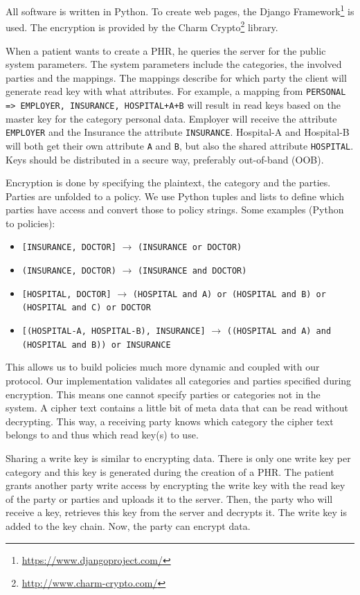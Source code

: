 \documentclass[a4paper]{article}
\begin{document}
		All software is written in Python. To create web pages, the Django Framework\footnote{\url{https://www.djangoproject.com/}} is used. The encryption is provided by the Charm Crypto\footnote{\url{http://www.charm-crypto.com/}} library.
	
		When a patient wants to create a PHR, he queries the server for the public system parameters. The system parameters include the categories, the involved parties and the mappings. The mappings describe for which party the client will generate read key with what attributes. For example, a mapping from \texttt{PERSONAL => EMPLOYER, INSURANCE, HOSPITAL+A+B} will result in read keys based on the master key for the category personal data. Employer will receive the attribute \texttt{EMPLOYER} and the Insurance the attribute \texttt{INSURANCE}. Hospital-A and Hospital-B will both get their own attribute \texttt{A} and \texttt{B}, but also the shared attribute \texttt{HOSPITAL}. Keys should be distributed in a secure way, preferably out-of-band (OOB).
		
		Encryption is done by specifying the plaintext, the category and the parties. Parties are unfolded to a policy. We use Python tuples and lists to define which parties have access and convert those to policy strings. Some examples (Python to policies):
		
		\begin{itemize}
			\item \texttt{[INSURANCE, DOCTOR]} $\rightarrow$ \texttt{(INSURANCE or DOCTOR)}
			\item \texttt{(INSURANCE, DOCTOR)} $\rightarrow$ \texttt{(INSURANCE and DOCTOR)}
			\item \texttt{[HOSPITAL, DOCTOR]} $\rightarrow$ \texttt{(HOSPITAL and A) or (HOSPITAL and B) or (HOSPITAL and C) or DOCTOR}
			\item \texttt{[(HOSPITAL-A, HOSPITAL-B), INSURANCE]} $\rightarrow$ \texttt{((HOSPITAL and A) and (HOSPITAL and B)) or INSURANCE}
		\end{itemize}
		
		This allows us to build policies much more dynamic and coupled with our protocol. Our implementation validates all categories and parties specified during encryption. This means one cannot specify parties or categories not in the system. A cipher text contains a little bit of meta data that can be read without decrypting. This way, a receiving party knows which category the cipher text belongs to and thus which read key(s) to use.
		
		Sharing a write key is similar to encrypting data. There is only one write key per category and this key is generated during the creation of a PHR. The patient grants another party write access by encrypting the write key with the read key of the party or parties and uploads it to the server. Then, the party who will receive a key, retrieves this key from the server and decrypts it. The write key is added to the key chain. Now, the party can encrypt data.
		
\end{document}
